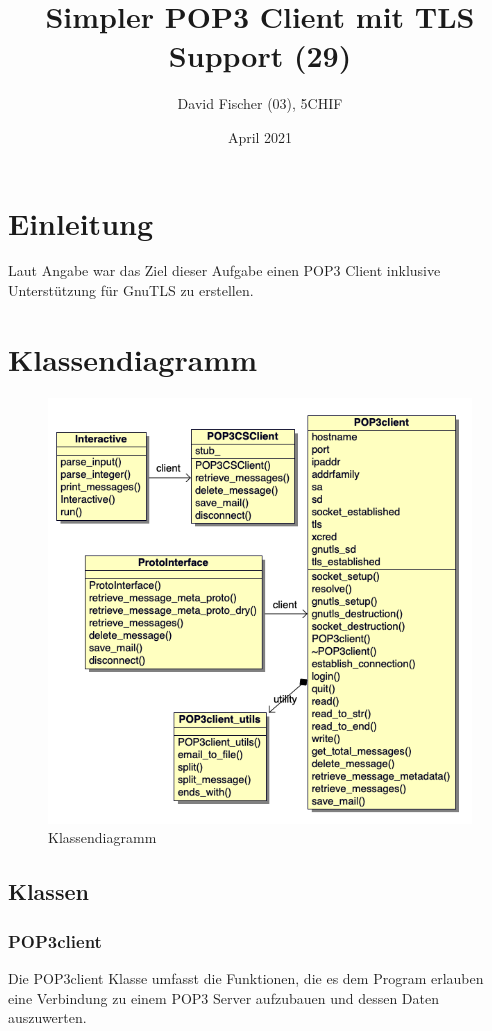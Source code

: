 \documentclass[12pt, letterpaper]{article}
\title{Simpler POP3 Client mit TLS Support (29)}
\author{David Fischer (03), 5CHIF}
\date{April 2021}
\begin{document}
\begin{titlepage}
\maketitle
\end{titlepage}

\tableofcontents
\newpage

\section{Einleitung}
Laut Angabe war das Ziel dieser Aufgabe einen POP3 Client inklusive Unterstützung für GnuTLS\cite{gnutls} zu erstellen.

\section{Klassendiagramm}

\begin{figure}[H]
  \centering
  \includegraphics[width=.7\textwidth]{kdg.png}
  \caption{Klassendiagramm}
  \label{fig:kdg}
\end{figure}

\subsection{Klassen}

\subsubsection{POP3client}
Die POP3client Klasse umfasst die Funktionen, die es dem Program erlauben eine Verbindung zu einem POP3 Server aufzubauen und dessen Daten auszuwerten.
\end{document}
